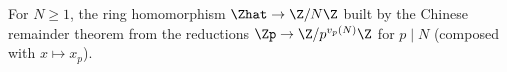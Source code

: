 For $N\ge1$, the ring homomorphism $\Zhat\to\Z/N\Z$ built by the Chinese remainder theorem from the reductions $\Zp\to\Z/p^{v_p(N)}\Z$ for $p\mid N$ (composed with $x\mapsto x_p$).

